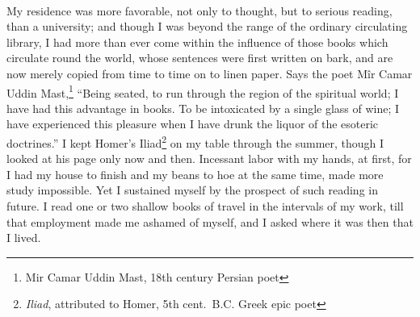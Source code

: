 \documentclass[letterpaper,12pt]{article}
\begin{document}
\paragraph{}
My residence was more favorable, not only to thought, but to serious reading,
than a university; and though I was beyond the range of the ordinary circulating
library, I had more than ever come within the influence of those books which
circulate round the world, whose sentences were first written on bark, and are
now merely copied from time to time on to linen paper.  Says the poet Mîr Camar
Uddin Mast,\footnote{Mir Camar Uddin Mast, 18th century Persian poet}
\enquote{Being seated, to run through the region of the spiritual world; I have
    had this advantage in books. To be intoxicated by a single glass of wine; I
    have experienced this pleasure when I have drunk the liquor of the esoteric
    doctrines.} I kept Homer's Iliad\footnote{\textit{Iliad}, attributed to
    Homer, 5th cent.\ B.C. Greek epic poet} on my table through the summer,
though I looked at his page only now and then.  Incessant labor with my hands,
at first, for I had my house to finish and my beans to hoe at the same time,
made more study impossible.  Yet I sustained myself by the prospect of such
reading in future.  I read one or two shallow books of travel in the intervals
of my work, till that employment made me ashamed of myself, and I asked where it
was then that I lived.
\end{document}
